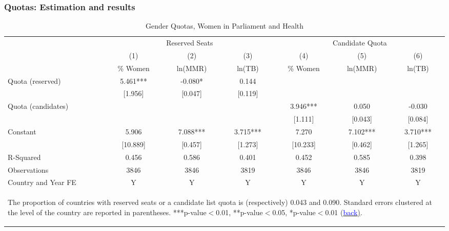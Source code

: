 \documentclass[10pt,letterpaper,subeqn]{beamer}
\begin{document}
\begin{frame}[plain, label=QuotaEstimates]
\frametitle{Quotas: Estimation and results}
\begin{table}[htbp]\centering
\tiny
\def\sym#1{\ifmmode^{#1}\else\(^{#1}\)\fi}
\caption{Gender Quotas, Women in Parliament and Health}
\begin{tabular}{l*{6}{c}}
\toprule
                    &\multicolumn{3}{c}{Reserved Seats}             &\multicolumn{3}{c}{Candidate Quota}            \\\cmidrule(lr){2-4}\cmidrule(lr){5-7}
                    &\multicolumn{1}{c}{(1)}&\multicolumn{1}{c}{(2)}&\multicolumn{1}{c}{(3)}&\multicolumn{1}{c}{(4)}&\multicolumn{1}{c}{(5)}&\multicolumn{1}{c}{(6)}\\
                    &\multicolumn{1}{c}{\% Women}&\multicolumn{1}{c}{ln(MMR)}&\multicolumn{1}{c}{ln(TB)}&\multicolumn{1}{c}{\% Women}&\multicolumn{1}{c}{ln(MMR)}&\multicolumn{1}{c}{ln(TB)}\\
\midrule
Quota (reserved)    &       5.461***&      -0.080*  &       0.144   &               &               &               \\
                    &     [1.956]   &     [0.047]   &     [0.119]   &               &               &               \\
Quota (candidates)  &               &               &               &       3.946***&       0.050   &      -0.030   \\
                    &               &               &               &     [1.111]   &     [0.043]   &     [0.084]   \\
Constant            &       5.906   &       7.088***&       3.715***&       7.270   &       7.102***&       3.710***\\
                    &    [10.889]   &     [0.457]   &     [1.273]   &    [10.233]   &     [0.462]   &     [1.265]   \\
\midrule
R-Squared           &       0.456   &       0.586   &       0.401   &       0.452   &       0.585   &       0.398   \\
Observations        &        3846   &        3846   &        3819   &        3846   &        3846   &        3819   \\
Country and Year FE &Y&Y&Y&Y&Y&Y \\                       
\bottomrule\multicolumn{7}{p{10cm}}{\begin{tiny} The proportion of     
countries with reserved seats or a candidate list quota is  (respectively) 0.043 and 0.090. Standard errors   
clustered at the level of the country are reported in parentheses.    
***p-value$<$0.01, **p-value$<$0.05, *p-value$<$0.01 (\hyperlink{Quotas}{\textcolor{blue}{back})}.
\end{tiny}}\end{tabular}\end{table}
\end{frame}
\end{document}
